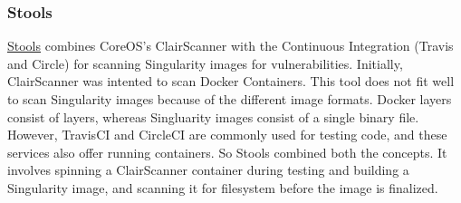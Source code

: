 \documentclass[a4paper,num-refs]{oup-contemporary}
\begin{document}
\subsubsection{Stools}

\href{https://github.com/singularityhub/stools}{Stools} combines CoreOS's ClairScanner with the Continuous Integration (Travis and
Circle) for scanning Singularity images for vulnerabilities.
Initially, ClairScanner was intented to scan Docker Containers. This tool does not fit well
to scan Singularity images because of the different image formats. Docker layers
consist of layers, whereas Singluarity images consist of a single binary file.
However, TravisCI and CircleCI are commonly used for testing code, and these
services also offer running containers. So Stools combined both the concepts.
It involves spinning a ClairScanner container during testing and building a
Singularity image, and scanning it for filesystem before the image is finalized.

\end{document}

